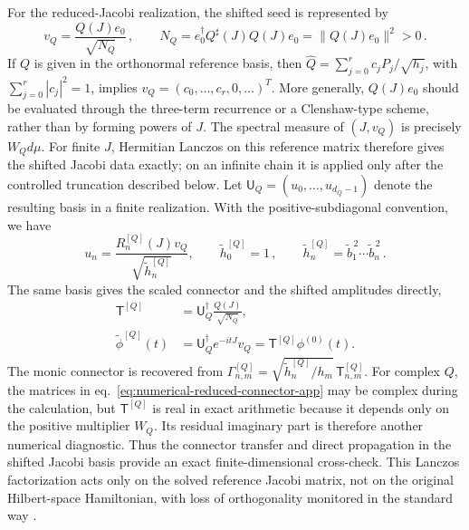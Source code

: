 \documentclass[a4paper,11pt]{article}
\def\dd{d}%
\def\ii{i}%
\def\ee{e}%
\def\Jac{J}%
\theoremstyle{definition}
\theoremstyle{remark}
\newcommand{\dd}{\mathrm d}
\newcommand{\ii}{\mathrm i}
\newcommand{\ee}{\mathrm e}
\newcommand{\Jac}{\mathsf J}
\newcommand{\tphi}{\widetilde\phi}
\newcommand{\thh}{\widetilde h}
\newcommand{\Qhat}{\widehat Q}
\newcommand{\Qsh}{Q^{\sharp}}
\begin{document}
For the reduced-Jacobi realization, the shifted seed is represented by
\begin{equation}
   v_Q=\frac{Q(\Jac)e_0}{\sqrt{N_Q}}\,,
   \qquad
   N_Q=e_0^\dagger\Qsh(\Jac)Q(\Jac)e_0
   =\|Q(\Jac)e_0\|^2>0\,.
   \label{eq:numerical-seed-vector-app}
\end{equation}
If $Q$ is given in the orthonormal reference basis, then
$\Qhat=\sum_{j=0}^{r}c_jP_j/\sqrt{h_j}$, with
$\sum_{j=0}^{r}|c_j|^2=1$, implies
$v_Q=(c_0,\ldots,c_r,0,\ldots)^T$.  More generally,
$Q(\Jac)e_0$ should be evaluated through the three-term recurrence or a
Clenshaw-type scheme, rather than by forming powers of $\Jac$. The spectral measure of $(\Jac,v_Q)$ is precisely $W_Q\dd\mu$.  For
finite $\Jac$, Hermitian Lanczos on this reference matrix therefore gives
the shifted Jacobi data exactly; on an infinite chain it is applied only
after the controlled truncation described below.  Let
$\mathsf U_Q=(u_0,\ldots,u_{d_Q-1})$ denote the resulting basis in a
finite realization.  With the positive-subdiagonal convention, we have
\begin{equation}
   u_n
   =\frac{R_n^{[Q]}(\Jac)v_Q}{\sqrt{\thh_n^{[Q]}}},
   \qquad
   \thh_0^{[Q]}=1\,,\qquad
   \thh_n^{[Q]}
   =\widetilde b_1^{\,2}\cdots\widetilde b_n^{\,2}\,.
\end{equation}
The same basis gives the scaled connector and the shifted amplitudes
directly, 
\begin{equation}
\begin{aligned}
   \mathsf T^{[Q]}
   &=\mathsf U_Q^\dagger
      \frac{Q(\Jac)}{\sqrt{N_Q}},\\
   \tphi^{[Q]}(t)
   &=\mathsf U_Q^\dagger\ee^{-\ii t\Jac}v_Q
   =\mathsf T^{[Q]}\phi^{(0)}(t).
\end{aligned}
   \label{eq:numerical-reduced-connector-app}
\end{equation}
The monic connector is recovered from
$\Gamma_{n,m}^{[Q]}
=\sqrt{\thh_n^{[Q]}/h_m}\,\mathsf T_{n,m}^{[Q]}$.
For complex $Q$, the matrices in
eq.~\eqref{eq:numerical-reduced-connector-app} may be complex during
the calculation, but $\mathsf T^{[Q]}$ is real in exact arithmetic
because it depends only on the positive multiplier $W_Q$.  Its residual
imaginary part is therefore another numerical diagnostic.
Thus the connector transfer and direct propagation in the shifted
Jacobi basis provide an exact finite-dimensional cross-check.  This Lanczos factorization acts only on the solved reference Jacobi matrix, not on the original Hilbert-space Hamiltonian, with loss of orthogonality monitored in the standard way \cite{ParlettScott1979}.
\end{document}
